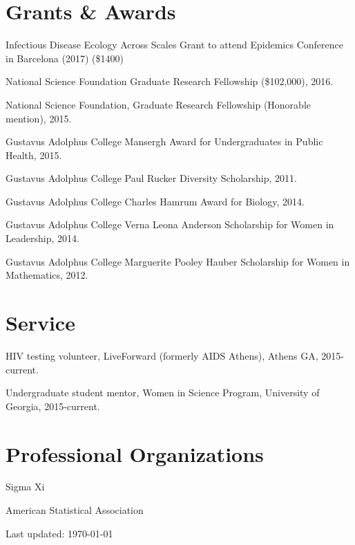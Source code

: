 \documentclass[letterpaper]{article}
\def\footerlink{}
\renewenvironment{itemize}{
  \begin{list}{}{
    \setlength{\leftmargin}{1.5em}
  }
}{
  \end{list}
}
\begin{document}
\section*{Grants \& Awards}

\begin{itemize}
\item Infectious Disease Ecology Across Scales Grant to attend Epidemics Conference in Barcelona (2017) (\$1400)
\item National Science Foundation Graduate Research Fellowship (\$102,000), 2016. 
\item National Science Foundation, Graduate Research Fellowship (Honorable mention), 2015.
\item Gustavus Adolphus College Mansergh Award for Undergraduates in Public Health, 2015.
\item Gustavus Adolphus College Paul Rucker Diversity Scholarship, 2011.
\item Gustavus Adolphus College Charles Hamrum Award for Biology, 2014.
\item Gustavus Adolphus College Verna Leona Anderson Scholarship for Women in Leadership, 2014. 
\item Gustavus Adolphus College Marguerite Pooley Hauber Scholarship for Women in Mathematics, 2012. 
\end{itemize}

\section*{Service}
\begin{itemize}
\item HIV testing volunteer, LiveForward (formerly AIDS Athens), Athens GA, 2015-current. 
\item Undergraduate student mentor, Women in Science Program, University of Georgia, 2015-current. 
\end{itemize}

\section*{Professional Organizations}
\begin{itemize}
\item Sigma Xi
\item American Statistical Association
\end{itemize}

\bigskip

\begin{center}
  \begin{footnotesize}
    Last updated: \today \\
    \href{\footerlink}{\texttt{\footerlink}}
  \end{footnotesize}
\end{center}
\end{document}
